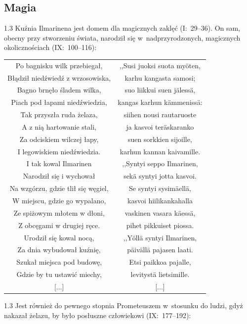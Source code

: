 \documentclass[11pt,a4paper,twoside]{report}
\begin{document}
\subsection*{Magia}
\begin{spacing}{1.3}
Kuźnia Ilmarinena jest domem dla magicznych zaklęć (I:~29--36). On sam, obecny przy stworzeniu świata, narodził się w~nadprzyrodzonych, magicznych  okolicznościach (IX:~100--116):
\end{spacing}
{\centering
\small
\begin{longtable}{c c}
Po bagnisku wilk przebiegał, & ,,Susi juoksi suota myöten, \\
Błądził niedźwiedź z wrzosowiska, & karhu kangasta samosi; \\
Bagno brnęło śladem wilka, & suo liikkui suen jälessä, \\
Piach pod łapami niedźwiedzia, & kangas karhun kämmenissä: \\
Tak przyszła ruda żelaza, & siihen nousi rautaruoste \\
A z nią hartowanie stali, & ja kasvoi teräskaranko \\
Za odciskiem wilczej łapy, & suen sorkkien sijoille, \\
I legowiskiem niedźwiedzia. & karhun kannan kaivamille. \\
I tak kowal Ilmarinen & ,,Syntyi seppo Ilmarinen, \\
Narodził się i wychował & sekä syntyi jotta kasvoi. \\
Na wzgórzu, gdzie tlił się węgiel, & Se syntyi sysimäellä, \\
W miejscu, gdzie go wypalano, & kasvoi hiilikankahalla \\
Ze spiżowym młotem w dłoni, & vaskinen vasara käessä, \\
Z obcęgami w drugiej ręce. & pihet pikkuiset piossa. \\
Urodził się kowal nocą, & ,,Yöllä syntyi Ilmarinen, \\
Za dnia wybudował kuźnię, & päivällä pajasen laati. \\
Szukał miejsca pod budowę, & Etsi paikkoa pajalle, \\
Gdzie by tu ustawić miechy, & levitystä lietsimille. \\
{[...]} & {[...]} \\
\end{longtable}
}
\begin{spacing}{1.3}
Jest również do pewnego stopnia Prometeuszem w~stosunku do ludzi, gdyż nakazał żelazu, by było posłuszne człowiekowi (IX:~177--192):
\end{spacing}
\end{document}
